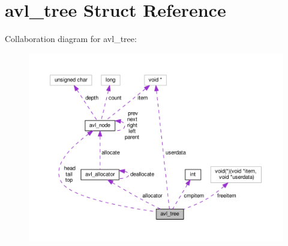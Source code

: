 \hypertarget{structavl__tree}{}\section{avl\+\_\+tree Struct Reference}
\label{structavl__tree}


Collaboration diagram for avl\+\_\+tree\+:\nopagebreak
\begin{figure}[H]
\begin{center}
\leavevmode
\includegraphics[width=350pt]{structavl__tree__coll__graph}
\end{center}
\end{figure}
